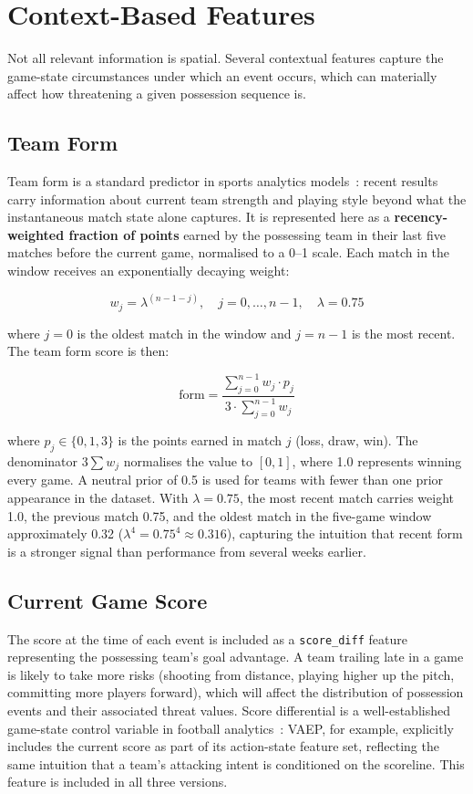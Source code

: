 \section{Context-Based Features}

Not all relevant information is spatial. Several contextual features capture the game-state circumstances under which an event occurs, which can materially affect how threatening a given possession sequence is.

\subsection{Team Form}

Team form is a standard predictor in sports analytics models~\cite{reep1968}: recent results carry information about current team strength and playing style beyond what the instantaneous match state alone captures. It is represented here as a \textbf{recency-weighted fraction of points} earned by the possessing team in their last five matches before the current game, normalised to a 0--1 scale. Each match in the window receives an exponentially decaying weight:

\[
w_j = \lambda^{(n-1-j)}, \quad j = 0, \ldots, n-1, \quad \lambda = 0.75
\]

where $j=0$ is the oldest match in the window and $j=n-1$ is the most recent. The team form score is then:

\[
\text{form} = \frac{\displaystyle\sum_{j=0}^{n-1} w_j \cdot p_j}{3 \cdot \displaystyle\sum_{j=0}^{n-1} w_j}
\]

where $p_j \in \{0, 1, 3\}$ is the points earned in match $j$ (loss, draw, win). The denominator $3\sum w_j$ normalises the value to $[0,1]$, where 1.0 represents winning every game. A neutral prior of 0.5 is used for teams with fewer than one prior appearance in the dataset. With $\lambda = 0.75$, the most recent match carries weight 1.0, the previous match 0.75, and the oldest match in the five-game window approximately 0.32 ($\lambda^4 = 0.75^4 \approx 0.316$), capturing the intuition that recent form is a stronger signal than performance from several weeks earlier.

\subsection{Current Game Score}

The score at the time of each event is included as a \texttt{score\_diff} feature representing the possessing team's goal advantage. A team trailing late in a game is likely to take more risks (shooting from distance, playing higher up the pitch, committing more players forward), which will affect the distribution of possession events and their associated threat values. Score differential is a well-established game-state control variable in football analytics~\cite{decroos2019}: VAEP, for example, explicitly includes the current score as part of its action-state feature set, reflecting the same intuition that a team's attacking intent is conditioned on the scoreline. This feature is included in all three versions.

